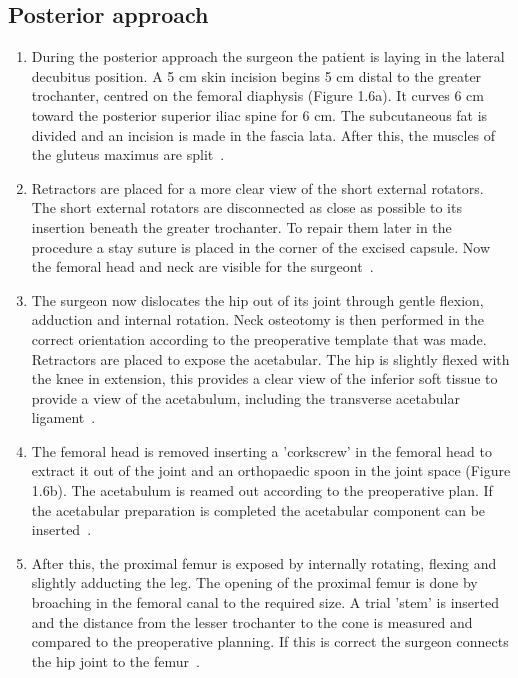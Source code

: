 \documentclass[whitelogo]{tudelft-report}
\begin{document}
{\subsection{Posterior approach}	\begin{enumerate}
	\item During the posterior approach the surgeon the patient is laying in the lateral decubitus position. A 5 cm skin incision begins 5 cm distal to the greater trochanter, centred on the femoral diaphysis (Figure 1.6a). It curves 6 cm toward the posterior superior iliac spine for 6 cm. The subcutaneous fat is divided and an incision is made in the fascia lata. After this, the muscles of the gluteus maximus are split~\cite{palan2018surgical}\cite{petis2015surgical}. 
	\item Retractors are placed for a more clear view of the short external rotators. The short external rotators are disconnected as close as possible to its insertion beneath the greater trochanter. To repair them later in the procedure a stay suture is placed in the corner of the excised capsule. Now the femoral head and neck are visible for the surgeont~\cite{palan2018surgical}\cite{petis2015surgical}. 
	\item The surgeon now dislocates the hip out of its joint through gentle flexion, adduction and internal rotation. Neck osteotomy is then performed in the correct orientation according to the preoperative template that was made. Retractors are placed to expose the acetabular. The hip is slightly flexed with the knee in extension, this provides a clear view of the inferior soft tissue to provide a view of the acetabulum, including the transverse acetabular ligament~\cite{palan2018surgical}\cite{petis2015surgical}. 
	\item The femoral head is removed inserting a 'corkscrew' in the femoral head to extract it out of the joint and an orthopaedic spoon in the joint space (Figure 1.6b). The acetabulum is reamed out according to the preoperative plan. If the acetabular preparation is completed the acetabular component can be inserted~\cite{palan2018surgical}\cite{petis2015surgical}. 
	\item After this, the proximal femur is exposed by internally rotating, flexing and slightly adducting the leg. The opening of the proximal femur is done by broaching in the femoral canal to the required size. A trial 'stem' is inserted and the distance from the lesser trochanter to the cone is measured and compared to the preoperative planning. If this is correct the surgeon connects the hip joint to the femur~\cite{palan2018surgical}\cite{petis2015surgical}.

\end{enumerate}}
\end{document}
